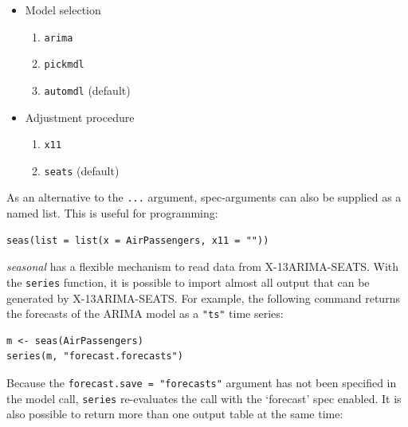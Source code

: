\begin{itemize}
\itemsep1pt\parskip0pt
\item
  Model selection

  \begin{enumerate}
  \def\labelenumi{\arabic{enumi}.}
  \itemsep1pt\parskip0pt
  \item
    \texttt{arima}
  \item
    \texttt{pickmdl}
  \item
    \texttt{automdl} (default)
  \end{enumerate}
\item
  Adjustment procedure

  \begin{enumerate}
  \def\labelenumi{\arabic{enumi}.}
  \itemsep1pt\parskip0pt
  \item
    \texttt{x11}
  \item
    \texttt{seats} (default)
  \end{enumerate}
\end{itemize}

As an alternative to the \texttt{...} argument, spec-arguments can also
be supplied as a named list. This is useful for programming:

\begin{verbatim}
seas(list = list(x = AirPassengers, x11 = ""))
\end{verbatim}


\emph{seasonal} has a flexible mechanism to read data from
X-13ARIMA-SEATS. With the \texttt{series} function, it is possible to
import almost all output that can be generated by X-13ARIMA-SEATS. For
example, the following command returns the forecasts of the ARIMA model
as a \texttt{"ts"} time series:

\begin{verbatim}
m <- seas(AirPassengers)
series(m, "forecast.forecasts")
\end{verbatim}

Because the \texttt{forecast.save = "forecasts"} argument has not been
specified in the model call, \texttt{series} re-evaluates the call with
the `forecast' spec enabled. It is also possible to return more than one
output table at the same time:

